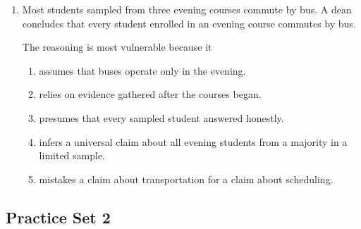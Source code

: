 \begin{enumerate}
\item Most students sampled from three evening courses commute by bus. A dean concludes that every student enrolled in an evening course commutes by bus.

The reasoning is most vulnerable because it
\begin{enumerate}
\item[(A)] assumes that buses operate only in the evening.
\item[(B)] relies on evidence gathered after the courses began.
\item[(C)] presumes that every sampled student answered honestly.
\item[(D)] infers a universal claim about all evening students from a majority in a limited sample.
\item[(E)] mistakes a claim about transportation for a claim about scheduling.
\end{enumerate}

\end{enumerate}

\subsection*{Practice Set 2}

